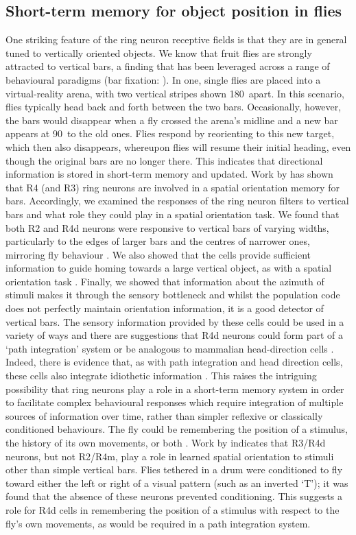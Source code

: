 \documentclass[10pt]{article}
\begin{document}
\subsection*{Short-term memory for object position in flies}
One striking feature of the ring neuron receptive fields is that they are in general tuned to vertically oriented objects. We know that fruit flies are strongly attracted to vertical bars, a finding that has been leveraged across a range of behavioural paradigms (bar fixation: \cite{Neuser2008}). In one, single flies are placed into a virtual-reality arena, with two vertical stripes shown 180\degree\ apart. In this scenario, flies typically head back and forth between the two bars. Occasionally, however, the bars would disappear when a fly crossed the arena’s midline and a new bar appears at 90\degree\ to the old ones. Flies respond by reorienting to this new target, which then also disappears, whereupon flies will resume their initial heading, even though the original bars are no longer there. This indicates that directional information is stored in short-term memory and updated. Work by \cite{Neuser2008} has shown that R4 (and R3) ring neurons are involved in a spatial orientation memory for bars. 
Accordingly, we examined the responses of the ring neuron filters to vertical bars and what role they could play in a spatial orientation task. We found that both R2 and R4d neurons were responsive to vertical bars of varying widths, particularly to the edges of larger bars and the centres of narrower ones, mirroring fly behaviour \cite{Osorio1990}. We also showed that the cells provide sufficient information to guide homing towards a large vertical object, as with a spatial orientation task \cite{Neuser2008}. Finally, we showed that information about the azimuth of stimuli makes it through the sensory bottleneck and whilst the population code does not perfectly maintain orientation information, it is a good detector of vertical bars. 
The sensory information provided by these cells could be used in a variety of ways and there are suggestions that R4d neurons could form part of a ‘path integration’ system \cite{Neuser2008} or be analogous to mammalian head-direction cells \cite{Tomchik2008}. Indeed, there is evidence that, as with path integration and head direction cells, these cells also integrate idiothetic information \cite{Zars2009}. This raises the intriguing possibility that ring neurons play a role in a short-term memory system in order to facilitate complex behavioural responses which require integration of multiple sources of information over time, rather than simpler reflexive or classically conditioned behaviours. The fly could be remembering the position of a stimulus, the history of its own movements, or both \cite{Tomchik2008}. Work by \cite{Guo2015} indicates that R3/R4d neurons, but not R2/R4m, play a role in learned spatial orientation to stimuli other than simple vertical bars. Flies tethered in a drum were conditioned to fly toward either the left or right of a visual pattern (such as an inverted ‘T’); it was found that the absence of these neurons prevented conditioning. This suggests a role for R4d cells in remembering the position of a stimulus with respect to the fly’s own movements, as would be required in a path integration system. 
\end{document}
